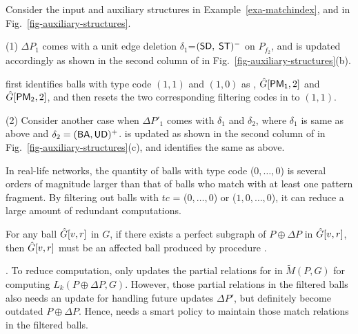 \begin{example}
\label{exa-identifyaffball}
Consider the input and auxiliary structures in Example~\ref{exa-matchindex}, and \bfc in Fig.~\ref{fig-auxiliary-structures}.

\sstab(1) $\Delta P_1$ comes with a unit edge deletion $\delta_1$=$({\mathsf{SD}},$ ${\mathsf{ST}})^-$ on $P_{f_2}$, and
\bfc is updated accordingly as shown in the second column of \bfc in Fig.~\ref{fig-auxiliary-structures}(b).

\identifyaffball first identifies balls with type code $(1, 1)$ and $(1, 0)$ as \affballsx,
\ie $\hat{G}{[{\mathsf{PM_1}},2]}$ and $\hat{G}{[{\mathsf{PM_2}},2]}$, and then \identifyaffball resets the two corresponding filtering codes in \bfc to $(1, 1)$.


\sstab(2) Consider another case when $\Delta P'_1$ comes with $\delta_1$ and $\delta_2$, where $\delta_1$ is same as above and $\delta_2 = ({\mathsf{BA}},{\mathsf{UD}})^+$. \bfc is updated as shown in the second column of \bfc in Fig.~\ref{fig-auxiliary-structures}(c), and \identifyaffball identifies the same \affballsx as above.
\end{example}

In real-life networks, the quantity of balls with type code ($0,\ldots,0$) is several orders of magnitude larger than that of balls who match with at least one pattern fragment. By filtering out balls with \eg $tc$ = ($0,\ldots,0$) or ($1,0,\ldots,0$),
it can reduce a large amount of redundant computations.


\begin{prop}
\label{prop-canaffballs}
For any ball $\hat{G}{[v,r]}$ in $G$, if there exists a perfect subgraph of $P\oplus \Delta P$ in $\hat{G}{[v,r]}$,
then $\hat{G}{[v,r]}$ must be an affected ball produced by procedure \identifyaffball.
\end{prop}



. To reduce computation, \incp only updates the partial relations for \affballsx in $\tilde{M}(P,G)$ for computing  $L_k(P\oplus \Delta P, G)$.
However, those partial relations in the filtered balls also needs an update for handling future updates $\Delta P'$, but
definitely become outdated \wrt $P\oplus \Delta P$.
Hence, \incp needs a smart policy to maintain those match relations in the filtered balls.


